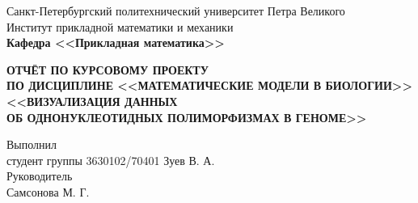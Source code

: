 \documentclass[main.tex]{subfiles}
\begin{document}
\begin{titlepage}
\begin{center}
	\begin{large}
		Санкт-Петербургский политехнический университет Петра Великого\\
		Институт прикладной математики и механики\\
		\textbf{Кафедра <<Прикладная математика>>}\\
	\end{large}
	\vfill
	\Large{\textbf{ОТЧЁТ ПО КУРСОВОМУ ПРОЕКТУ\\
            ПО ДИСЦИПЛИНЕ <<МАТЕМАТИЧЕСКИЕ МОДЕЛИ В БИОЛОГИИ>> \\
        	<<ВИЗУАЛИЗАЦИЯ ДАННЫХ \\
        	ОБ ОДНОНУКЛЕОТИДНЫХ ПОЛИМОРФИЗМАХ В ГЕНОМЕ>>}} \normalsize
\end{center}
\vfill
\flushleft
Выполнил\\
студент группы 3630102/70401
\flushright
Зуев В. А.\\
\flushleft
Руководитель\\
\flushright
Самсонова М. Г.
\flushleft
\vfill
{}
\end{titlepage}
\end{document}
